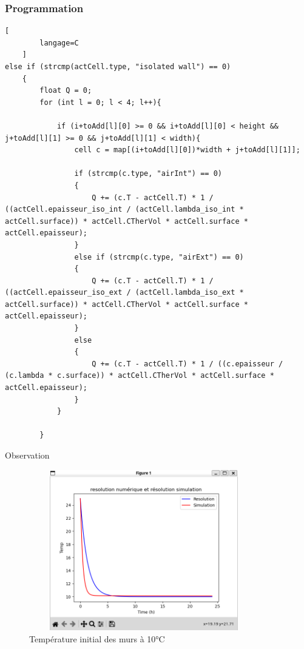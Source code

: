 \documentclass{beamer}
\begin{document}
\begin{frame}[fragile]
\frametitle{Programmation}
    \begin{lstlisting}[
        langage=C
    ]
else if (strcmp(actCell.type, "isolated wall") == 0)
    {
        float Q = 0;
        for (int l = 0; l < 4; l++){

            if (i+toAdd[l][0] >= 0 && i+toAdd[l][0] < height && j+toAdd[l][1] >= 0 && j+toAdd[l][1] < width){
                cell c = map[(i+toAdd[l][0])*width + j+toAdd[l][1]];
                
                if (strcmp(c.type, "airInt") == 0)
                {
                    Q += (c.T - actCell.T) * 1 / ((actCell.epaisseur_iso_int / (actCell.lambda_iso_int * actCell.surface)) * actCell.CTherVol * actCell.surface * actCell.epaisseur);
                }
                else if (strcmp(c.type, "airExt") == 0)
                {
                    Q += (c.T - actCell.T) * 1 / ((actCell.epaisseur_iso_ext / (actCell.lambda_iso_ext * actCell.surface)) * actCell.CTherVol * actCell.surface * actCell.epaisseur);
                }
                else
                {
                    Q += (c.T - actCell.T) * 1 / ((c.epaisseur / (c.lambda * c.surface)) * actCell.CTherVol * actCell.surface * actCell.epaisseur);
                }
            }

        }
    \end{lstlisting}
\end{frame}



\begin{frame}{Observation}
    \begin{figure}
        \centering
        \includegraphics[width=10cm, height=7cm]{courbe3.png}
        \caption{Température initial des murs à 10°C}
        \label{fig:courbe3}
    \end{figure}
\end{frame}
\end{document}
